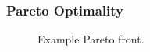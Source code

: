 \begin{frame}
  \frametitle{Pareto Optimality}
        
  \begin{figure}[htbp!]
    \begin{center}
      \resizebox{0.6\columnwidth}{!}{}
    \end{center}
          \caption{Example Pareto front.}
    \label{fig:pareto-example}
  \end{figure}
\end{frame}